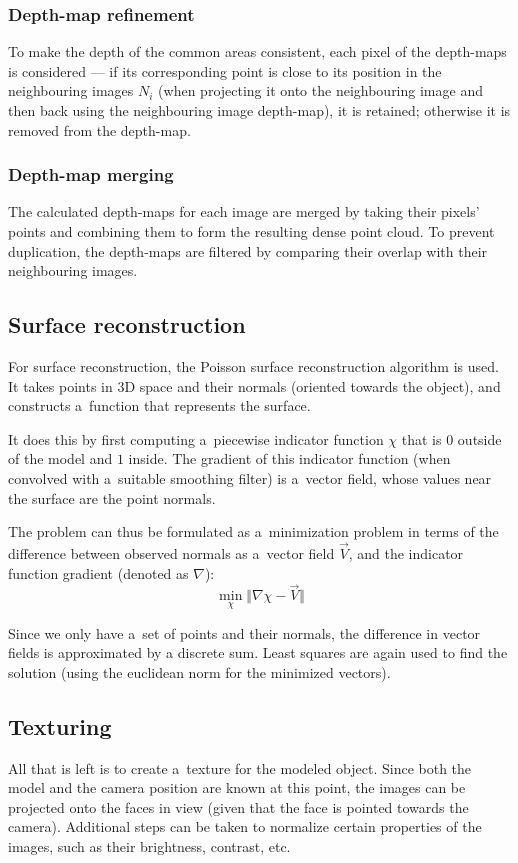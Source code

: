\subsubsection{Depth-map refinement}
To make the depth of the common areas consistent, each pixel of the depth-maps is considered --- if its corresponding point is close to its position in the neighbouring images $N_i$ (when projecting it onto the neighbouring image and then back using the neighbouring image depth-map), it is retained; otherwise it is removed from the depth-map.

\subsubsection{Depth-map merging}
The calculated depth-maps for each image are merged by taking their pixels' points and combining them to form the resulting dense point cloud.
To prevent duplication, the depth-maps are filtered by comparing their overlap with their neighbouring images.

\subsection{Surface reconstruction}
For surface reconstruction, the Poisson surface reconstruction algorithm \cite{kazhdan2006poisson} is used.
It takes points in 3D space and their normals (oriented towards the object), and constructs a~function that represents the surface.

It does this by first computing a~piecewise indicator function $\chi$ that is $0$ outside of the model and $1$ inside. The gradient of this indicator function (when convolved with a~suitable smoothing filter) is a~vector field, whose values near the surface are the point normals.

The problem can thus be formulated as a~minimization problem in terms of the difference between observed normals as a~vector field $\vec{V}$, and the indicator function gradient (denoted as $\nabla$):
\begin{equation} \min_\chi \Vert \nabla \chi - \vec{V} \Vert \end{equation}

Since we only have a~set of points and their normals, the difference in vector fields is approximated by a discrete sum.
Least squares are again used to find the solution (using the euclidean norm for the minimized vectors).

\subsection{Texturing}
All that is left is to create a~texture for the modeled object.
Since both the model and the camera position are known at this point, the images can be projected onto the faces in view (given that the face is pointed towards the camera).
Additional steps can be taken to normalize certain properties of the images, such as their brightness, contrast, etc.

